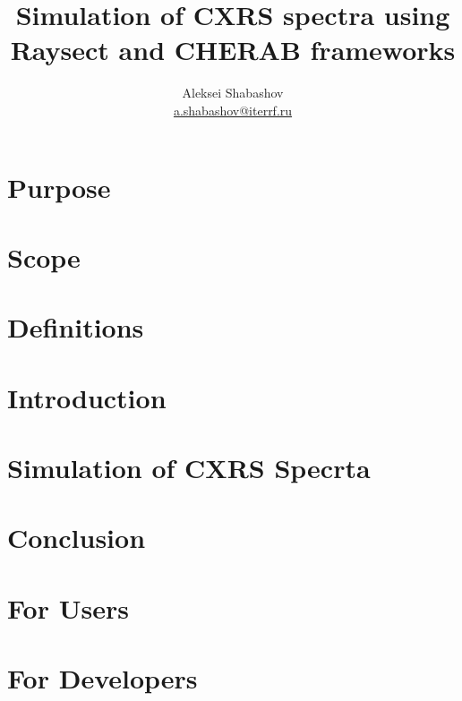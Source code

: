 \documentclass[a4paper,12pt,titlepage,english,final]{article}
\title{Simulation of CXRS spectra using Raysect and CHERAB frameworks}
\author{Aleksei Shabashov \\ \href{mailto:a.shabashov@iterrf.ru}{a.shabashov@iterrf.ru}}
\date{}
\begin{document}
\maketitle
\tableofcontents%

\section{Purpose}%
\label{sec:purpose}


\section{Scope}%
\label{sec:scope}


\section{Definitions}%
\label{sec:definitions}


\section{Introduction}%
\label{sec:introduction}


\section{Simulation of CXRS Specrta}%
\label{sec:simulation}


\section{Conclusion}%
\label{sec:conclusion}


\printbibliography%

\begin{appendices}
    \section{For Users}%
    \label{app:users}
    

    \section{For Developers}%
    \label{app:developers}
    
\end{appendices}
\end{document}
